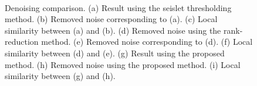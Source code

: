 \begin{figure}[ht!]
    \\
	\caption{Denoising comparison. (a) Result using the seislet thresholding method.  (b) Removed noise corresponding to (a). (c) Local similarity between (a) and (b). (d) Removed noise using the rank-reduction method. (e) Removed noise corresponding to (d). (f) Local similarity between (d) and (e).  (g) Result using the proposed method.  (h) Removed noise using the proposed method. (i) Local similarity between (g) and (h). }
	\label{fig:r3d-comp}
\end{figure}



